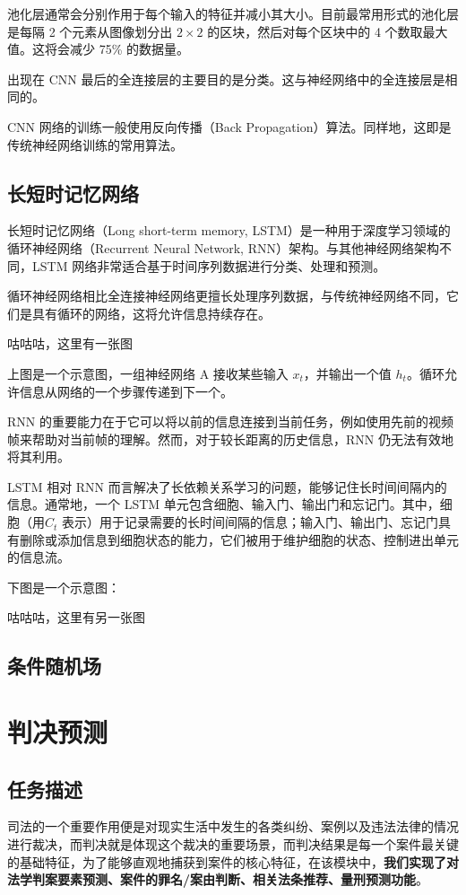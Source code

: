 池化层通常会分别作用于每个输入的特征并减小其大小。目前最常用形式的池化层是每隔 2 个元素从图像划分出 ${\displaystyle 2\times 2}$ 的区块，然后对每个区块中的 4 个数取最大值。这将会减少 75\% 的数据量。

出现在 CNN 最后的全连接层的主要目的是分类。这与神经网络中的全连接层是相同的。

CNN 网络的训练一般使用反向传播（Back Propagation）算法。同样地，这即是传统神经网络训练的常用算法。


\subsection{长短时记忆网络}

长短时记忆网络（Long short-term memory, LSTM）是一种用于深度学习领域的循环神经网络（Recurrent Neural Network, RNN）架构。与其他神经网络架构不同，LSTM 网络非常适合基于时间序列数据进行分类、处理和预测。

循环神经网络相比全连接神经网络更擅长处理序列数据，与传统神经网络不同，它们是具有循环的网络，这将允许信息持续存在。

咕咕咕，这里有一张图

上图是一个示意图，一组神经网络 A 接收某些输入 ${\displaystyle x_t}$，并输出一个值 ${\displaystyle h_t}$。循环允许信息从网络的一个步骤传递到下一个。

RNN 的重要能力在于它可以将以前的信息连接到当前任务，例如使用先前的视频帧来帮助对当前帧的理解。然而，对于较长距离的历史信息，RNN 仍无法有效地将其利用。

LSTM 相对 RNN 而言解决了长依赖关系学习的问题，能够记住长时间间隔内的信息。通常地，一个 LSTM 单元包含细胞、输入门、输出门和忘记门。其中，细胞（用${\displaystyle C_t}$ 表示）用于记录需要的长时间间隔的信息；输入门、输出门、忘记门具有删除或添加信息到细胞状态的能力，它们被用于维护细胞的状态、控制进出单元的信息流。

下图是一个示意图：

咕咕咕，这里有另一张图


\subsection{条件随机场}


\section{判决预测}
\subsection{任务描述}
司法的一个重要作用便是对现实生活中发生的各类纠纷、案例以及违法法律的情况进行裁决，而判决就是体现这个裁决的重要场景，而判决结果是每一个案件最关键的基础特征，为了能够直观地捕获到案件的核心特征，在该模块中，\textbf{我们实现了对法学判案要素预测、案件的罪名/案由判断、相关法条推荐、量刑预测功能}。

